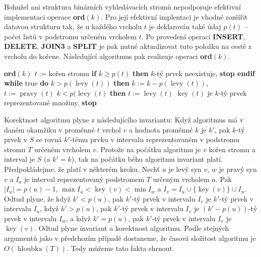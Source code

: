 \documentclass[a4paper,12pt]{article}
\DeclareMathOperator*{\levy}{levy}
\DeclareMathOperator*{\pravy}{pravy}
\DeclareMathOperator*{\key}{key}
\DeclareMathOperator*{\hloubka}{hloubka}
\newcommand{\algoritmus}[1]{
  {
  \setlength\fboxrule{0.5pt}

  \begin{boxedminipage}{0.8\textwidth}

 #1
  \end{boxedminipage}

  }
  }
\begin{document}
Bohužel ani struktura binárních vyhledávacích 
stromů nepodporuje efektivní implementaci operace 
{\bf ord$(k)$}. Pro její efektivní implentaci je vhodné rozšířit 
datovou strukturu tak, že u každého vrcholu $t$ je deklarován 
také údaj $p(t)$ -- počet listů v podstromu určeném 
vrcholem $t$. Po provedení operací {\bf INSERT}, {\bf DELETE}, {\bf JOIN3} a 
{\bf SPLIT} je pak nutné aktualizovat tuto položku na cestě z 
vrcholu do kořene. Následující algoritmus pak 
realizuje operaci {\bf ord}$(k)$.

\algoritmus{{\bf ord$(k)$ \newline 
$t:=$}kořen stromu \newline 
{\bf \textsf{if}} $k\ge p(t)$ {\bf \textsf{then}} $k$-tý prvek neexistuje, {\bf \textsf{stop} \textsf{endif}\newline 
\textsf{while}} true {\bf \textsf{do}}\newline 
\phantom{---}{\bf \textsf{if}} $k>p(\levy(t))$ {\bf \textsf{then}}\newline 
\phantom{------}$k:=k-p(\levy(t))$, $t:=\pravy(t)$\newline 
\phantom{---}{\bf \textsf{else}}\newline 
\phantom{------}{\bf \textsf{if}} $k<p(\levy(t)$ {\bf \textsf{then}}\newline 
\phantom{---------}$t:=\levy(t)$\newline 
\phantom{------}{\bf \textsf{else}}\newline 
\phantom{---------}$\key(t)$ je $k$-tý prvek reprezentované množiny, \textsf{\bf stop} \newline 
\phantom{------}{\bf \textsf{endif}}\newline 
\phantom{---}{\bf \textsf{endif}\newline 
\textsf{enddo}}}

Korektnost algoritmu plyne z následujícího invariantu:  
Když algoritmus má v daném okamžiku v proměnné $t$ vrchol $
v$ 
a hodnota proměnné $k$ je $k'$, pak $k$-tý prvek v $S$ se rovná 
$k'$-tému prvku v intervalu reprezentovaném v podstromu 
stromu $T$ určeném vrcholem $v$.  Protože na počátku algoritmu 
je $v$ kořen stromu a interval je $S$ (a $k'=k$), tak na počátku 
běhu algoritmu invariant platí.  Předpokládejme, že platí v 
některém kroku.  Nechť $u$ je levý syn $v$, $w$ je pravý syn $
v$ a 
$I_a$ je interval reprezentovaný podstromem $T$ určeným vrcholem $
a$.  
Pak $|I_u|=p(u)-1$, $\max I_u<\key(v)<\min I_w$ a 
$I_v=I_u\cup \{\key(v)\}\cup I_w$.  Odtud plyne, že když $k'
<p(u)$, pak 
$k'$-tý prvek v intervalu $I_v$ je $k'$-tý prvek v intervalu $
I_u$, když 
$k'>p(u)$, pak $k'$-tý prvek v intervalu $I_v$ je $(k'-p(u))$-tý prvek 
v intervalu $I_w$, a když $k'=p(u)$, pak $k'$-tý prvek v intervalu $
I_v$ 
je $\key(v)$.  Odtud plyne invariant a korektnost algoritmu.  
Podle stejných argumentů jako v předchozím případě 
dostaneme, že časová složitost algoritmu je $O(\hloubka
(T))$.  
Tedy můžeme tato fakta shrnout.  
\end{document}
